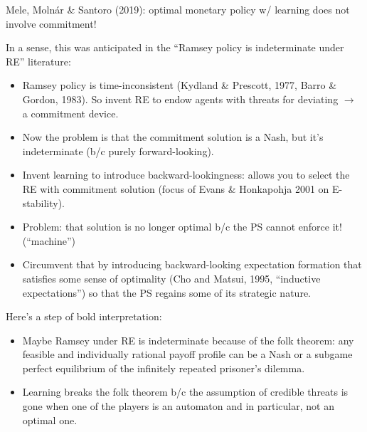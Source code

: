 \documentclass[11pt]{article}
\renewcommand{\[}{\begin{equation}}
\renewcommand{\]}{\end{equation}}
\begin{document}
 Mele, Moln\'ar \& Santoro (2019): optimal monetary policy w/ learning does not involve commitment! %
 
 In a sense, this was anticipated in the ``Ramsey policy is indeterminate under RE'' literature:
 \begin{itemize}
 \item Ramsey policy is time-inconsistent (Kydland \& Prescott, 1977, Barro \& Gordon, 1983). So invent RE to endow agents with threats for deviating $\rightarrow$ a commitment device.
 \item Now the problem is that the commitment solution is a Nash, but it's indeterminate (b/c purely forward-looking).
 \item Invent learning to introduce backward-lookingness: allows you to select the RE with commitment solution (focus of Evans \& Honkapohja 2001 on E-stability).
 \item Problem: that solution is no longer optimal b/c the PS cannot enforce it! (``machine'')
 \item Circumvent that by introducing backward-looking expectation formation that satisfies some sense of optimality (Cho and Matsui, 1995, ``inductive expectations'') so that the PS regains some of its strategic nature.
 \end{itemize}
 
 Here's a step of bold interpretation:
 \begin{itemize}
 \item Maybe Ramsey under RE is indeterminate because of the folk theorem: any feasible and individually rational payoff profile can be a Nash or a subgame perfect equilibrium of the infinitely repeated prisoner's dilemma.
 \item Learning breaks the folk theorem b/c the assumption of credible threats is gone when one of the players is an automaton and in particular, not an optimal one. 
 \end{itemize}

\newpage
\end{document}
